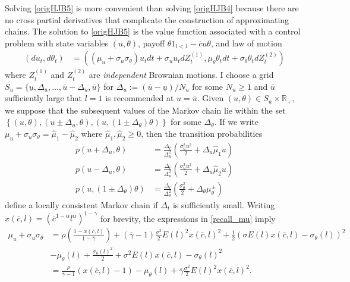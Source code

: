 \documentclass[11pt]{article}
\theoremstyle{plain}
\begin{document}
Solving \eqref{origHJB5} is more convenient than solving \eqref{origHJB4} because there are no cross partial derivatives that complicate the construction of approximating chains. The solution to \eqref{origHJB5} is the value function associated with a control problem with state variables $(u,\theta)$, payoff $\theta 1_{l<1} - \overline{c}u\theta$, and law of motion 
\begin{equation}
\begin{aligned}
(du_t, d\theta_t) & = {\left((\mu_u + \sigma_u \sigma_{\theta})u_tdt + \sigma_uu_tdZ_t^{(1)}, \mu_{\theta}\theta_tdt + \sigma_{\theta}\theta_tdZ_t^{(2)}\right)}
\end{aligned}
\label{newLAW}
\end{equation}
where $Z_t^{(1)}$ and $Z_t^{(2)}$ are \textit{independent} Brownian motions. I choose a grid $S_u = \{\underline{u}, \Delta_u, \dots, \overline{u} - \Delta_u, \overline{u}\}$ for $\Delta_u := (\overline{u} - \underline{u})/N_u$ for some $N_u \geq 1$ and $\overline{u}$ sufficiently large that $l=1$ is recommended at $u = \overline{u}$. Given $(u,\theta) \in S_u \times \mathbb{R}_+$, we suppose that the subsequent values of the Markov chain lie within the set ${\left\{(u, \theta), (u \pm \Delta_u, \theta), (u, (1 \pm \Delta_{\theta})\theta) \right\}}$ for some $\Delta_{\theta}$. If we write $\mu_u + \sigma_u\sigma_{\theta} = \hat{\mu}_1 - \hat{\mu}_2$ where $\hat{\mu}_1, \hat{\mu}_2 \geq 0$, then the transition probabilities
\begin{equation}
\begin{aligned}
p(u+\Delta_u,\theta) & = \frac{\Delta_t}{\Delta_u^2}{\left(\frac{\sigma_u^2u^2}{2} + \Delta_u\hat{\mu}_1u\right)}
\\ p(u-\Delta_u,\theta) & = \frac{\Delta_t}{\Delta_u^2}{\left(\frac{\sigma_u^2u^2}{2} + \Delta_u\hat{\mu}_2u\right)}
\\ p(u, (1 \pm \Delta_{\theta})\theta) & = \frac{\Delta_t}{\Delta_{\theta}^2}{\left(\frac{\sigma_{\theta}^2}{2} + \Delta_{\theta}\mu_{\theta}^{\pm}\right)} 
\end{aligned} 
\label{u_prob2}
\end{equation}
define a locally consistent Markov chain if $\Delta_t$ is sufficiently small. Writing $x(\overline{c},l) = (\overline{c}^{1-\alpha}l^{\alpha})^{1-\gamma}$ for brevity, the expressions in \eqref{recall_mu} imply
\begin{align*}
\mu_u + \sigma_u\sigma_{\theta} & = \rho {\left(\frac{1 - x(\overline{c},l)}{1-\overline{\gamma}}\right)} + (\overline{\gamma}-1)\frac{\sigma^2}{2} E(l)^2x(\overline{c},l)^2 + \frac{1}{2}(\sigma E(l)x(\overline{c},l) - \sigma_{\theta}(l))^2
\\ & - \mu_{\theta}(l) + \frac{\sigma_{\theta}(l)^2}{2} + \sigma^2E(l)x(\overline{c},l) - \sigma_{\theta}(l)^2
\\ & = \frac{\rho}{\overline{\gamma}-1}(x(\overline{c},l)-1) - \mu_{\theta}(l)  + \overline{\gamma}\frac{\sigma^2}{2} E(l)^2x(\overline{c},l)^2.
\end{align*} 
\end{document}
